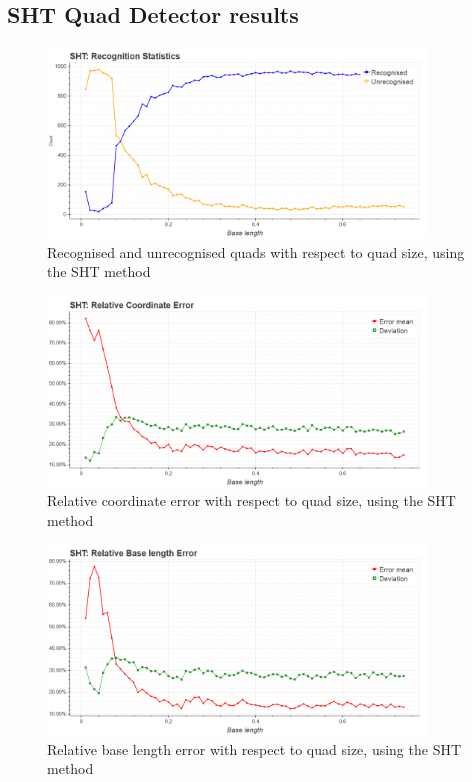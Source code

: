 \clearpage

\subsection{SHT Quad Detector results}

\begin{figure}[ht]
	\centering
	\includegraphics[width=0.9\textwidth]{figures/plots/sht_rec_unrec_count.png}
	\caption{Recognised and unrecognised quads with respect to quad size, using the SHT method}
	\label{fig:shtRecCnt}
\end{figure}

\begin{figure}[ht]
	\centering
	\includegraphics[width=0.9\textwidth]{figures/plots/sht_relative_coordinate_error.png}
	\caption{Relative coordinate error with respect to quad size, using the SHT method}
	\label{fig:shtRelCoordErr}
\end{figure}

\begin{figure}[ht]
	\centering
	\includegraphics[width=0.9\textwidth]{figures/plots/sht_relative_base_length_error.png}
	\caption{Relative base length error with respect to quad size, using the SHT method}
	\label{fig:shtRelBaseErr}
\end{figure}

